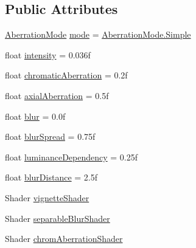 \subsection*{Public Attributes}
\begin{DoxyCompactItemize}
\item 
\mbox{\hyperlink{class_unity_standard_assets_1_1_image_effects_1_1_vignette_and_chromatic_aberration_a10685d35dba29662e0f140819dbe2bf0}{Aberration\+Mode}} \mbox{\hyperlink{class_unity_standard_assets_1_1_image_effects_1_1_vignette_and_chromatic_aberration_ac19f537aa5b9d09058f41017ba95a1cf}{mode}} = \mbox{\hyperlink{class_unity_standard_assets_1_1_image_effects_1_1_vignette_and_chromatic_aberration_a10685d35dba29662e0f140819dbe2bf0a1fbb1e3943c2c6c560247ac8f9289780}{Aberration\+Mode.\+Simple}}
\item 
float \mbox{\hyperlink{class_unity_standard_assets_1_1_image_effects_1_1_vignette_and_chromatic_aberration_aa07536e34a44bc112626361563c0c584}{intensity}} = 0.\+036f
\item 
float \mbox{\hyperlink{class_unity_standard_assets_1_1_image_effects_1_1_vignette_and_chromatic_aberration_a88b22a1f50c42ba424b48538b596cfd3}{chromatic\+Aberration}} = 0.\+2f
\item 
float \mbox{\hyperlink{class_unity_standard_assets_1_1_image_effects_1_1_vignette_and_chromatic_aberration_a8f23dbe611808d156011bb3cff6a4404}{axial\+Aberration}} = 0.\+5f
\item 
float \mbox{\hyperlink{class_unity_standard_assets_1_1_image_effects_1_1_vignette_and_chromatic_aberration_adbcc251a66abf7754099be15a67ec29b}{blur}} = 0.\+0f
\item 
float \mbox{\hyperlink{class_unity_standard_assets_1_1_image_effects_1_1_vignette_and_chromatic_aberration_a5a5115712deeb7135a7fc4eaa9cb7914}{blur\+Spread}} = 0.\+75f
\item 
float \mbox{\hyperlink{class_unity_standard_assets_1_1_image_effects_1_1_vignette_and_chromatic_aberration_a22eb4e810de317ef2f0e72b3780c3300}{luminance\+Dependency}} = 0.\+25f
\item 
float \mbox{\hyperlink{class_unity_standard_assets_1_1_image_effects_1_1_vignette_and_chromatic_aberration_a5a8659f4b8144ee9684cbdb0fd018ac3}{blur\+Distance}} = 2.\+5f
\item 
Shader \mbox{\hyperlink{class_unity_standard_assets_1_1_image_effects_1_1_vignette_and_chromatic_aberration_a50e8b2c6fce44601d55142dbd9eb3c2b}{vignette\+Shader}}
\item 
Shader \mbox{\hyperlink{class_unity_standard_assets_1_1_image_effects_1_1_vignette_and_chromatic_aberration_a0e40441f82cc813fab01bbc56d897f7f}{separable\+Blur\+Shader}}
\item 
Shader \mbox{\hyperlink{class_unity_standard_assets_1_1_image_effects_1_1_vignette_and_chromatic_aberration_ab53f26a839d099d2fb4b5cfeeaa5b60f}{chrom\+Aberration\+Shader}}
\end{DoxyCompactItemize}
